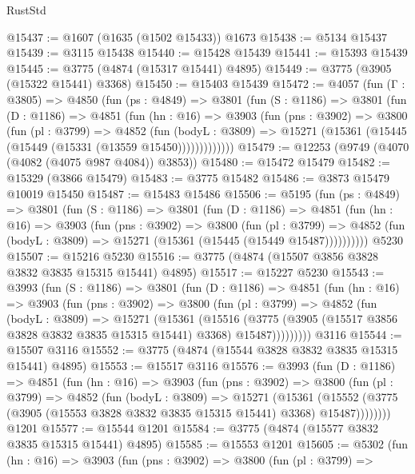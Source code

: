 \begin{lexlean}{RustStd}
\begin{coremodule}
{\begin{coremodule}
{{{{{{{{{{{{{{{{{{{{{{{{{{{{{{{@15437 := @1607 (@1635 (@1502 @15433)) @1673
@15438 := @5134 @15437
@15439 := @3115 @15438
@15440 := @15428 @15439
@15441 := @15393 @15439
@15445 := @3775 (@4874 (@15317 @15441) @4895)
@15449 := @3775 (@3905 (@15322 @15441) @3368)
@15450 := @15403 @15439
@15472 := @4057
    (fun (Γ : @3805) =>
    @4850
      (fun (ps : @4849) =>
      @3801
        (fun (S : @1186) =>
        @3801
          (fun (D : @1186) =>
          @4851
            (fun (hn : @16) =>
            @3903
              (fun (pns : @3902) =>
              @3800
                (fun (pl : @3799) =>
                @4852
                  (fun (bodyL : @3809) =>
                  @15271 (@15361 (@15445 (@15449 (@15331 (@13559 @15450)))))))))))))
@15479 := @12253 (@9749 (@4070 (@4082 (@4075 @987 @4084)) @3853))
@15480 := @15472 @15479
@15482 := @15329 (@3866 @15479)
@15483 := @3775 @15482
@15486 := @3873 @15479 @10019 @15450
@15487 := @15483 @15486
@15506 := @5195
    (fun (ps : @4849) =>
    @3801
      (fun (S : @1186) =>
      @3801
        (fun (D : @1186) =>
        @4851
          (fun (hn : @16) =>
          @3903
            (fun (pns : @3902) =>
            @3800
              (fun (pl : @3799) =>
              @4852 (fun (bodyL : @3809) => @15271 (@15361 (@15445 (@15449 @15487))))))))))
    @5230
@15507 := @15216 @5230
@15516 := @3775 (@4874 (@15507 @3856 @3828 @3832 @3835 @15315 @15441) @4895)
@15517 := @15227 @5230
@15543 := @3993
    (fun (S : @1186) =>
    @3801
      (fun (D : @1186) =>
      @4851
        (fun (hn : @16) =>
        @3903
          (fun (pns : @3902) =>
          @3800
            (fun (pl : @3799) =>
            @4852
              (fun (bodyL : @3809) =>
              @15271
                (@15361
                  (@15516
                    (@3775
                      (@3905 (@15517 @3856 @3828 @3832 @3835 @15315 @15441) @3368)
                      @15487)))))))))
    @3116
@15544 := @15507 @3116
@15552 := @3775 (@4874 (@15544 @3828 @3832 @3835 @15315 @15441) @4895)
@15553 := @15517 @3116
@15576 := @3993
    (fun (D : @1186) =>
    @4851
      (fun (hn : @16) =>
      @3903
        (fun (pns : @3902) =>
        @3800
          (fun (pl : @3799) =>
          @4852
            (fun (bodyL : @3809) =>
            @15271
              (@15361
                (@15552 (@3775 (@3905 (@15553 @3828 @3832 @3835 @15315 @15441) @3368) @15487))))))))
    @1201
@15577 := @15544 @1201
@15584 := @3775 (@4874 (@15577 @3832 @3835 @15315 @15441) @4895)
@15585 := @15553 @1201
@15605 := @5302
    (fun (hn : @16) =>
    @3903
      (fun (pns : @3902) =>
      @3800
        (fun (pl : @3799) =>
}}}}}}}}}}}}}}}}}}}}}}}}}}}}}}}
\end{coremodule}}
\end{coremodule}
\end{lexlean}
